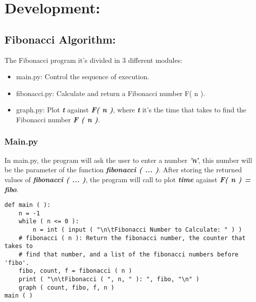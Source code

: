 \documentclass[10pt,a4paper]{article}
\begin{document}
\section{Development:}

\subsection{Fibonacci Algorithm:}

The Fibonacci program it's divided in 3 different modules:

\begin{itemize}
\item main.py: Control the sequence of execution.
\item fibonacci.py: Calculate and return a Fibonacci number F( n ). 
\item graph.py: Plot {\bfseries\itshape t} against {\bfseries\itshape F( n )}, where {\bfseries\itshape t} it's the time that takes to find the Fibonacci number {\bfseries\itshape F ( n )}.
\end{itemize}

{\bfseries\itshape\color{OliveGreen}{Observation:}} {\itshape{}}

\subsubsection{Main.py}

In main.py, the program will ask the user to enter a number {\bfseries\itshape 'n'}, this number will be the parameter of the function {\bfseries\itshape fibonacci ( ... )}. After storing the returned values of {\bfseries\itshape fibonacci ( ... )}, the program will call  to plot {\bfseries\itshape time} against {\bfseries\itshape F( n ) = fibo}. \hfill \break

\begin{lstlisting}
def main ( ):
    n = -1
    while ( n <= 0 ):
        n = int ( input ( "\n\tFibonacci Number to Calculate: " ) )
    # fibonacci ( n ): Return the fibonacci number, the counter that takes to
    # find that number, and a list of the fibonacci numbers before 'fibo'.
    fibo, count, f = fibonacci ( n )
    print ( "\n\tFibonacci ( ", n, " ): ", fibo, "\n" )
    graph ( count, fibo, f, n )
main ( )
\end{lstlisting} 
\end{document}
